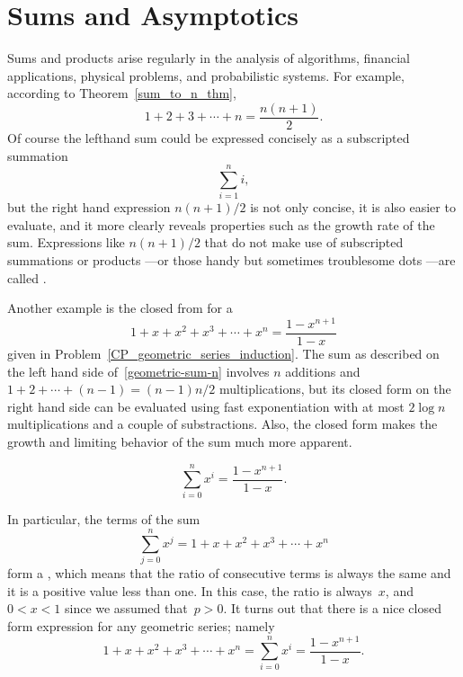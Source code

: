 \chapter{Sums and Asymptotics}\label{chap:asymptotics}

Sums and products arise regularly in the analysis of algorithms,
financial applications, physical problems, and probabilistic systems.
For example, according to Theorem~\ref{sum_to_n_thm},
\begin{equation}\label{sum1n_closedform}
1 + 2 + 3 +\cdots + n = \frac{n(n+1)}{2}.
\end{equation}
Of course the lefthand sum could be expressed concisely as a subscripted summation
\[
\sum_{i=1}^n i,
\]
but the right hand expression $n(n+1)/2$ is not only concise, it is
also easier to evaluate, and it more clearly reveals properties such
as the growth rate of the sum.  Expressions like $n(n+1)/2$ that do
not make use of subscripted summations or products ---or those handy
but sometimes troublesome dots ---are called .

Another example is the closed from for a 
\begin{equation}\label{geometric-sum-n}
1 + x + x^2 + x^3 + \cdots + x^{n} = \frac{1 - x^{n+1}}{1 - x}
\end{equation}
given in Problem~\ref{CP_geometric_series_induction}.  The sum as
described on the left hand side of~\eqref{geometric-sum-n} involves
$n$ additions and $1 + 2 + \cdots + (n-1) = (n-1)n/2$ multiplications,
but its closed form on the right hand side can be evaluated using fast
exponentiation with at most $2 \log n$ multiplications and a couple of
substractions.  Also, the closed form makes the growth and limiting
behavior of the sum much more apparent.

\iffalse

\begin{equation}\label{geometric-sum-n-1}
    \sum_{i = 0}^{n} x^i = \frac{1 - x^{n+1}}{1 - x}.
\end{equation}

In particular, the terms of the sum
\[
    \sum_{j = 0}^{n} x^j = 1 + x + x^2 + x^3 + \cdots + x^{n}
\]
form a , which means that the ratio of
consecutive terms is always the same and it is a positive value less
than one.  In this case, the ratio is always~$x$, and $0 < x < 1$
since we assumed that~$p > 0$.  It turns out that there is a nice
closed form expression for any geometric series; namely
\begin{equation}\label{geometric-sum-n-1}
1 + x + x^2 + x^3 + \cdots + x^{n} = \sum_{i = 0}^{n} x^i = \frac{1 - x^{n+1}}{1 - x}.
\end{equation}


